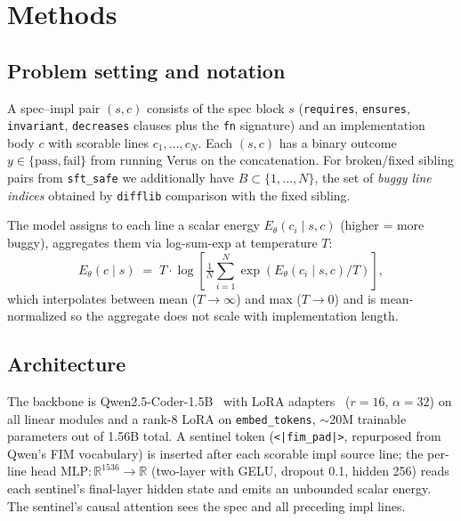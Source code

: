 \documentclass[10pt]{article}
\begin{document}
\section{Methods}
\label{sec:methods}

\subsection{Problem setting and notation}
A spec--impl pair $(s, c)$ consists of the spec block $s$
(\texttt{requires}, \texttt{ensures}, \texttt{invariant}, \texttt{decreases}
clauses plus the \texttt{fn} signature) and an implementation body $c$ with
scorable lines $c_1, \dots, c_N$. Each $(s,c)$ has a binary outcome
$y \in \{\text{pass}, \text{fail}\}$ from running Verus on the concatenation.
For broken/fixed sibling pairs from \texttt{sft\_safe} we additionally have
$B \subset \{1,\dots,N\}$, the set of \emph{buggy line indices} obtained by
\texttt{difflib} comparison with the fixed sibling.

The model assigns to each line a scalar energy $E_\theta(c_i \mid s, c)$
(higher = more buggy), aggregates them via log-sum-exp at temperature $T$:
\begin{equation}
\label{eq:lse}
E_\theta(c \mid s) \;=\; T \cdot \log \left[ \tfrac{1}{N} \sum_{i=1}^{N}
\exp\!\left( E_\theta(c_i \mid s, c) / T \right) \right],
\end{equation}
which interpolates between mean ($T \to \infty$) and max ($T \to 0$) and is
mean-normalized so the aggregate does not scale with implementation length.

\subsection{Architecture}
\label{sec:methods:arch}
The backbone is Qwen2.5-Coder-1.5B~\cite{qwen25coder} with LoRA
adapters~\cite{hu2021lora} ($r{=}16$, $\alpha{=}32$) on all linear modules
and a rank-8 LoRA on \texttt{embed\_tokens}, $\sim$20M trainable parameters
out of 1.56B total. A sentinel token (\verb+<|fim_pad|>+, repurposed from
Qwen's FIM vocabulary) is inserted after each scorable impl source line; the
per-line head $\text{MLP}: \mathbb{R}^{1536} \to \mathbb{R}$
(two-layer with GELU, dropout 0.1, hidden 256) reads each sentinel's
final-layer hidden state and emits an unbounded scalar energy. The
sentinel's causal attention sees the spec and all preceding impl lines.
\end{document}

